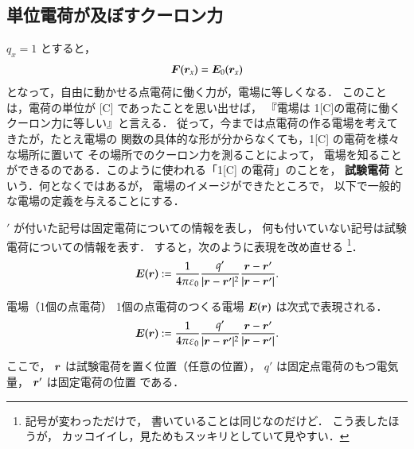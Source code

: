     \subsection{単位電荷が及ぼすクーロン力}
                $q_{x}=1$ とすると，
                        \begin{align}
                            \boldsymbol{F}(\boldsymbol{r}_{x})
                            =\boldsymbol{E}_{0}(\boldsymbol{r}_{x})
                        \end{align}
                となって，自由に動かせる点電荷に働く力が，電場に等しくなる．
                このことは，電荷の単位が [C] であったことを思い出せば，
                『電場は 1[C]の電荷に働くクーロン力に等しい』と言える．
                従って，今までは点電荷の作る電場を考えてきたが，たとえ電場の
                関数の具体的な形が分からなくても，1[C] の電荷を様々な場所に置いて
                その場所でのクーロン力を測ることによって，
                電場を知ることができるのである．このように使われる「1[C] の電荷」のことを，
                \textbf{試験電荷} という．何となくではあるが，
                電場のイメージができたところで，
                以下で一般的な電場の定義を与えることにする．

                $'$ が付いた記号は固定電荷についての情報を表し，
                何も付いていない記号は試験電荷についての情報を表す．
                すると，次のように表現を改め直せる
                    \footnote{
                        記号が変わっただけで，
                        書いていることは同じなのだけど．
                        こう表したほうが，
                        カッコイイし，見ためもスッキリとしていて見やすい．
                    }．
                    \begin{align*}
                        \boldsymbol{E}(\boldsymbol{r}) := \frac{1}{4\pi\varepsilon_{0}}
                                    \frac{q'}{|\boldsymbol{r}-\boldsymbol{r}'|^{2}}
                                    \frac{\boldsymbol{r}-\boldsymbol{r}'}{|\boldsymbol{r}-\boldsymbol{r}'|}.
                    \end{align*}
                    \begin{myshadebox}{電場（1個の点電荷）}
                        1個の点電荷のつくる電場 $\boldsymbol{E}(\boldsymbol{r})$ は次式で表現される．
                        \begin{align*}
                            \boldsymbol{E}(\boldsymbol{r}) := \frac{1}{4\pi\varepsilon_{0}}
                                        \frac{q'}{|\boldsymbol{r}-\boldsymbol{r}'|^{2}}
                                        \frac{\boldsymbol{r}-\boldsymbol{r}'}{|\boldsymbol{r}-\boldsymbol{r}'|}.
                        \end{align*}

                        ここで，
                            $\boldsymbol{r}$ は試験電荷を置く位置（任意の位置），
                            $q'$ は固定点電荷のもつ電気量，
                            $\boldsymbol{r}'$ は固定電荷の位置
                        である．
                    \end{myshadebox}


